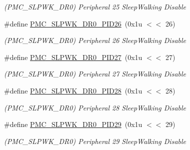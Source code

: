 \begin{DoxyCompactItemize}
\begin{DoxyCompactList}\small\item\em (P\+M\+C\+\_\+\+S\+L\+P\+W\+K\+\_\+\+D\+R0) Peripheral 25 Sleep\+Walking Disable \end{DoxyCompactList}\item 
\mbox{\label{group__SAMS70__PMC_gac30ab55e859fff38f4d947cbbe2ede8a}} 
\#define \mbox{\hyperlink{group__SAMS70__PMC_gac30ab55e859fff38f4d947cbbe2ede8a}{P\+M\+C\+\_\+\+S\+L\+P\+W\+K\+\_\+\+D\+R0\+\_\+\+P\+I\+D26}}~(0x1u $<$$<$ 26)
\begin{DoxyCompactList}\small\item\em (P\+M\+C\+\_\+\+S\+L\+P\+W\+K\+\_\+\+D\+R0) Peripheral 26 Sleep\+Walking Disable \end{DoxyCompactList}\item 
\mbox{\label{group__SAMS70__PMC_gac05c9ac4acc0d89d111dad66b29678ad}} 
\#define \mbox{\hyperlink{group__SAMS70__PMC_gac05c9ac4acc0d89d111dad66b29678ad}{P\+M\+C\+\_\+\+S\+L\+P\+W\+K\+\_\+\+D\+R0\+\_\+\+P\+I\+D27}}~(0x1u $<$$<$ 27)
\begin{DoxyCompactList}\small\item\em (P\+M\+C\+\_\+\+S\+L\+P\+W\+K\+\_\+\+D\+R0) Peripheral 27 Sleep\+Walking Disable \end{DoxyCompactList}\item 
\mbox{\label{group__SAMS70__PMC_ga101ebe9b346860a4308e825640c16ae0}} 
\#define \mbox{\hyperlink{group__SAMS70__PMC_ga101ebe9b346860a4308e825640c16ae0}{P\+M\+C\+\_\+\+S\+L\+P\+W\+K\+\_\+\+D\+R0\+\_\+\+P\+I\+D28}}~(0x1u $<$$<$ 28)
\begin{DoxyCompactList}\small\item\em (P\+M\+C\+\_\+\+S\+L\+P\+W\+K\+\_\+\+D\+R0) Peripheral 28 Sleep\+Walking Disable \end{DoxyCompactList}\item 
\mbox{\label{group__SAMS70__PMC_gabbf17fd219ae47df8d9adfc09818b8ff}} 
\#define \mbox{\hyperlink{group__SAMS70__PMC_gabbf17fd219ae47df8d9adfc09818b8ff}{P\+M\+C\+\_\+\+S\+L\+P\+W\+K\+\_\+\+D\+R0\+\_\+\+P\+I\+D29}}~(0x1u $<$$<$ 29)
\begin{DoxyCompactList}\small\item\em (P\+M\+C\+\_\+\+S\+L\+P\+W\+K\+\_\+\+D\+R0) Peripheral 29 Sleep\+Walking Disable \end{DoxyCompactList}\item 

\end{DoxyCompactItemize}
